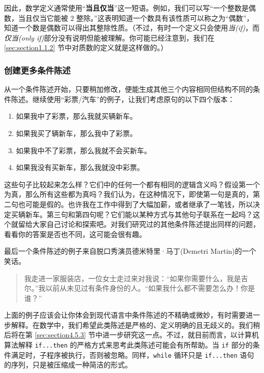 因此，数学定义通常使用``\textbf{当且仅当}''这一短语。例如，我们可以写``一个整数是偶数，当且仅当它能被 $2$ 整除。''这表明知道一个数具有该性质可以称之为``偶数''，知道一个数是偶数可以得出其整除性质。（不过，有时一个定义只会使用\emph{当(if)}，而\emph{仅当(only if)}部分没有说明但能被理解。你可能已经注意到，我们在 \ref{sec:section1.1.2} 节中对质数的定义就是这样做的。）

\subsubsection*{创建更多条件陈述}

从一个条件陈述开始，只要稍加修改，便能生成其他三个内容相同但结构不同的条件陈述。继续使用``彩票/汽车''的例子，让我们考虑原句的以下四个版本：

\begin{enumerate}
    \item 如果我中了彩票，那么我就买辆新车。
    \item 如果我买了辆新车，那么我中了彩票。
    \item 如果我中不了彩票，那么我就不会买新车。
    \item 如果我没有买新车，那么我就没中彩票。
\end{enumerate}

这些句子比较起来怎么样？它们中的任何一个都有相同的逻辑含义吗？假设第一个为真，那么所有这些都为真吗？我们认为，在这种情况下，即使第一句是真的，第二句也可能是假的。也许我在工作中得到了大幅加薪，或者继承了一笔钱，所以决定买辆新车。第三句和第四句呢？它们能以某种方式与其他句子联系在一起吗？这个就留给大家自己讨论和探索吧。对我们研究过的其他条件陈述提出同样的问题，看看你的答案是否也不同，这可能会很有趣。

最后一个条件陈述的例子来自脱口秀演员德米特里·马丁(Demetri Martin)的一个笑话。

\begin{quote}
    我走进一家服装店，一位女士走过来对我说：``如果你需要什么，我是吉尔。''我以前从未见过有条件身份的人。``如果我什么都不需要怎么办！你是谁？''
\end{quote}

上面的例子应该会让你体会到现代语言中条件陈述的不精确或微妙，有时需要进一步解释。在数学中，我们希望此类陈述是严格的、定义明确的且无歧义的。我们稍后将在第 \ref{sec:section4.5.3} 节中进一步研究这一点。不过，就目前而言，以计算机算法解释 \verb|if...then| 的严格方式来思考此类陈述可能会有所帮助。当 \verb|if| 部分的条件满足时，子程序被执行，否则被忽略。同样，\verb|while| 循环只是 \verb|if...then| 语句的序列，只是被压缩成一种简洁的形式。

